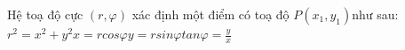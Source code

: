 \documentclass[preview]{standalone}
\begin{document}
\begin{center}
Hệ toạ độ cực $(r,\varphi)$ xác định một điểm có toạ độ $P(x_1, y_1)$như sau:$r^2=x^2+y^2$$x=rcos\varphi$$y=rsin\varphi$$tan\varphi=\frac{y}{x}$
\end{center}
\end{document}
